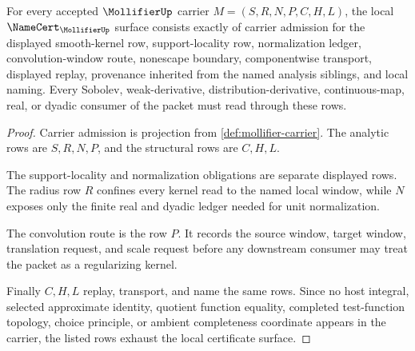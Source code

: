 \begin{theorem}
\label{thm:mollifier-namecert-obligations}
For every accepted $\MollifierUp$ carrier $M=(S,R,N,P,C,H,L)$, the local $\NameCert_{\MollifierUp}$ surface consists exactly of carrier admission for the displayed smooth-kernel row, support-locality row, normalization ledger, convolution-window route, nonescape boundary, componentwise transport, displayed replay, provenance inherited from the named analysis siblings, and local naming. Every Sobolev, weak-derivative, distribution-derivative, continuous-map, real, or dyadic consumer of the packet must read through these rows.
\end{theorem}
\begin{proof}
Carrier admission is projection from \autoref{def:mollifier-carrier}. The analytic rows are $S,R,N,P$, and the structural rows are $C,H,L$.

The support-locality and normalization obligations are separate displayed rows. The radius row $R$ confines every kernel read to the named local window, while $N$ exposes only the finite real and dyadic ledger needed for unit normalization.

The convolution route is the row $P$. It records the source window, target window, translation request, and scale request before any downstream consumer may treat the packet as a regularizing kernel.

Finally $C,H,L$ replay, transport, and name the same rows. Since no host integral, selected approximate identity, quotient function equality, completed test-function topology, choice principle, or ambient completeness coordinate appears in the carrier, the listed rows exhaust the local certificate surface.
\end{proof}

